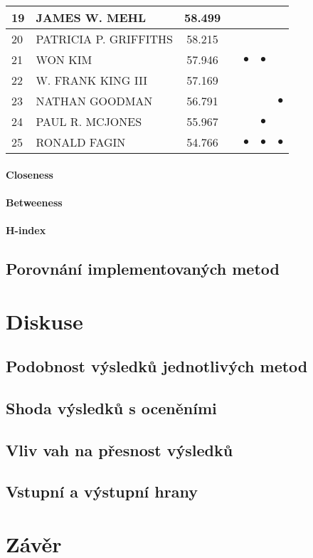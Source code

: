 \documentclass[12pt,titlepage]{report}
\begin{document}
\begin{center}
\begin{tabular}{|l|l|c|c|c|c|c|}
\hline
19 & JAMES W. MEHL & 58.499         &           &           &           &           \\
\hline
20 & PATRICIA P. GRIFFITHS & 58.215 &           &           &           &           \\
\hline
21 & WON KIM & 57.946               &           & $\bullet$ & $\bullet$ &           \\
\hline
22 & W. FRANK KING III & 57.169     &           &           &           &           \\
\hline
23 & NATHAN GOODMAN & 56.791        &           &           &           & $\bullet$ \\
\hline
24 & PAUL R. MCJONES & 55.967       &           &           & $\bullet$ &           \\
\hline
25 & RONALD FAGIN & 54.766          &           & $\bullet$ & $\bullet$ & $\bullet$ \\
\hline
\end{tabular}
\end{center}

\subsubsection{Closeness}
\subsubsection{Betweeness}
\subsubsection{H-index}

\section{Porovnání implementovaných metod}

\chapter{Diskuse}
\section{Podobnost výsledků jednotlivých metod}

\section{Shoda výsledků s oceněními}

\section{Vliv vah na přesnost výsledků}

\section{Vstupní a výstupní hrany}


\chapter{Závěr}



\end{document}
